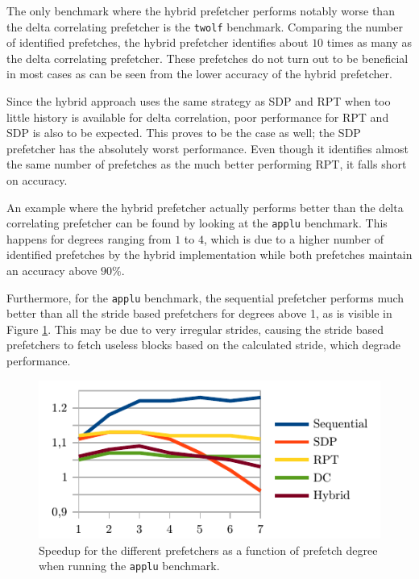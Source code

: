 The only benchmark where the hybrid prefetcher performs notably worse than the
delta correlating prefetcher is the \texttt{twolf} benchmark.
Comparing the number of identified prefetches, the hybrid prefetcher identifies
about $10$ times as many as the delta correlating prefetcher.
These prefetches do not turn out to be beneficial in most cases as can be seen
from the lower accuracy of the hybrid prefetcher.

Since the hybrid approach uses the same strategy as SDP and RPT when too little
history is available for delta correlation, poor performance for RPT and SDP is
also to be expected.
This proves to be the case as well; the SDP prefetcher has the absolutely worst
performance.
Even though it identifies almost the same number of prefetches as the much
better performing RPT, it falls short on accuracy.

An example where the hybrid prefetcher actually performs better than the delta
correlating prefetcher can be found by looking at the \texttt{applu} benchmark.
This happens for degrees ranging from $1$ to $4$, which is due to a higher
number of identified prefetches by the hybrid implementation while both
prefetches maintain an accuracy above $90\%$.

Furthermore, for the \texttt{applu} benchmark, the sequential prefetcher
performs much better than all the stride based prefetchers for degrees above 1,
as is visible in Figure \ref{fig:applu}.
This may be due to very irregular strides, causing the stride based prefetchers
to fetch useless blocks based on the calculated stride, which degrade
performance.

\begin{figure}
  \centering
  \includegraphics{plots/applu.pdf}
  \caption{
      Speedup for the different prefetchers as a function of prefetch degree
      when running the \texttt{applu} benchmark.
  }
  \label{fig:applu}
\end{figure}
